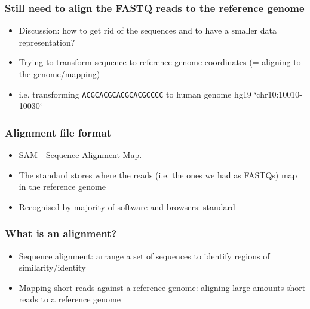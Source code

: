 \documentclass{beamer}
\begin{document}


\begin{frame}
  \frametitle{Still need to align the FASTQ reads to the reference genome}
  \begin{itemize}
  \item Discussion: how to get rid of the sequences and to have a smaller data representation?
  \item Trying to transform sequence to reference genome coordinates (= aligning to the genome/mapping) 
  \item i.e. transforming \texttt{ACGCACGCACGCACGCCCC} to human genome hg19 `chr10:10010-10030`
  \end{itemize}
\end{frame}



\begin{frame}
  \frametitle{Alignment file format}
  \begin{itemize}
  \item  SAM - Sequence Alignment Map.	
  \item The standard stores where the reads (i.e. the ones we had as FASTQs) map in the reference genome
  \item  Recognised by majority of software and browsers: standard

  \end{itemize}
\end{frame}

\begin{frame}
  \frametitle{What is an alignment?}
  \begin{itemize}
  \item Sequence alignment: arrange a set of sequences to identify regions of similarity/identity
  \item Mapping short reads against a reference genome: aligning large amounts short reads to a reference genome
  \end{itemize}
\end{frame}
\end{document}
